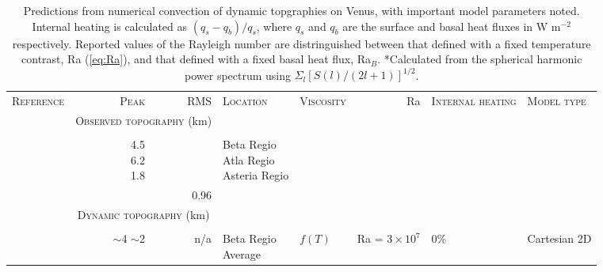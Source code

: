\begin{landscape}
\thispagestyle{empty}

\footnotesize


\begin{longtable}{ @{} p{4cm} r r p{2cm} p{2cm} r p{1.5cm} p{5cm} @{} } 
\caption{Predictions from numerical convection of dynamic topgraphies on Venus, with important model parameters noted. Internal heating is calculated as $(q_s - q_b)/q_s$, where $q_s$ and $q_b$ are the surface and basal heat fluxes in W m$^{-2}$ respectively. Reported values of the Rayleigh number are distringuished between that defined with a fixed temperature contrast, Ra (\ref{eq:Ra}), and that defined with a fixed basal heat flux, Ra$_B$. \;\;  *Calculated from the spherical harmonic power spectrum using $\Sigma_l [S(l)/(2l + 1)]^{1/2}$.} \label{tab:dyn_topo_obvs}\\

\toprule

\textsc{Reference} & \textsc{Peak} & \textsc{RMS} & \textsc{Location} & \textsc{Viscosity} & Ra & \textsc{Internal heating} & \textsc{Model type} \\

\; & \multicolumn{2}{c}{\textsc{Observed topography} (km)} \\
\cline{2-3} \\


\citet{Smrekar1991} & \makecell[tr]{4.5 \\ 6.2 \\ 1.8} &  & \makecell[tl]{Beta Regio \\ Atla Regio \\ Asteria Regio} \\
\citet{Rappaport1999} &  &  0.96 &  \\


\; & \multicolumn{2}{c}{\textsc{Dynamic topography} (km)} \\
\cline{2-3} \\


\citet{Solomatov1996a} & \makecell[tl]{$\sim$4 \\ $\sim$2} & n/a  & \makecell[cl]{Beta Regio \\ Average} & $f(T)$  & Ra = $3 \times 10^7$  & 0\% & Cartesian 2D \\


\end{longtable}
\end{landscape}
